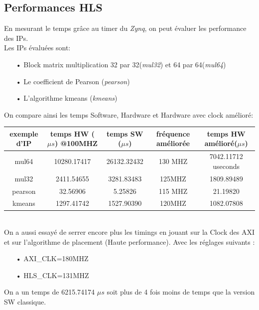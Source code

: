 \documentclass[12pt,a4paper]{article}
\begin{document}
\subsection{Performances HLS}
En mesurant le temps grâce au timer du \textit{Zynq}, on peut évaluer les performance des IPs.\\
Les IPs évaluées sont:
\begin{itemize}
	\item[•]Block matrix multiplication 32 par 32(\textit{mul32}) et 64 par 64(\textit{mul64})
	\item[•]Le coefficient de Pearson (\textit{pearson})
	\item[•]L'algorithme kmeans (\textit{kmeans})
\end{itemize}
\bigskip
On compare ainsi les temps Software, Hardware et Hardware avec clock amélioré:\\
\bigskip
\begin{tabular}{|c|c|c|c|c|}
	\hline
	\scriptsize exemple d'IP & \scriptsize temps HW ($\mu s$) @100MHZ & \scriptsize temps SW ($\mu s$) & \scriptsize fréquence améliorée & \scriptsize temps HW amélioré($\mu s$) \\ \hline
	mul64           &              10280.17417               &          26132.32432           &            130 MHZ             &          7042.11712 useconds           \\
	mul32           &               2411.54655               &           3281.83483           &             125MHZ             &               1809.89489               \\
	pearson          &                32.56906                &            5.25826             &            115 MHZ             &                21.19820                \\
	kmeans          &               1297.41742               &         1527.90390          &             120MHZ             &               1082.07808               \\ \hline
\end{tabular}\\
\bigskip
On a aussi essayé de serrer encore plus les timings en jouant sur la Clock des AXI et sur l'algorithme de placement (Haute performance). Avec les réglages suivants : 
\begin{itemize}
	\item[•]AXI\_CLK=180MHZ
	\item[•]HLS\_CLK=131MHZ
\end{itemize}
On a un temps de 6215.74174 $\mu s$ soit plus de 4 fois moins de temps que la version SW classique.
\end{document}
